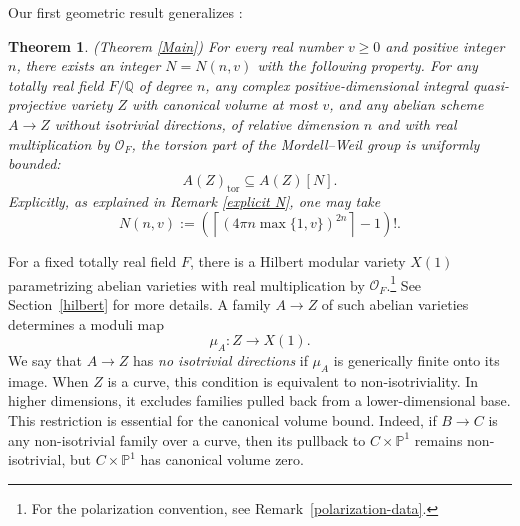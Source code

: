 \documentclass[12 pt]{amsart}
\newtheorem{theorem}{Theorem}[section]
\theoremstyle{definition}
\begin{document}
Our first geometric result
generalizes \cite[Theorem~A]{bakker2018geometric}:
\renewcommand*{\thetheorem}{\Alph{theorem}}
\begin{theorem}\label{Canonical vol}(Theorem \ref{Main})
For every real number \(v\geq 0\) and positive integer \(n\), there exists
an integer \(N=N(n,v)\) with the following property. For any totally real field
\(F/\mathbb Q\) of degree \(n\), any complex positive-dimensional integral
quasi-projective variety \(Z\) with canonical volume at most \(v\), and
any abelian scheme \(A\to Z\) without isotrivial directions, of relative
dimension \(n\) and with real multiplication by \(\mathcal O_F\), the
torsion part of the Mordell--Weil group is uniformly bounded:
\[
A(Z)_{\mathrm{tor}}\subseteq A(Z)[N].
\]
Explicitly, as explained in Remark \ref{explicit N}, one may take
\[N(n,v):=
\left(
\left\lceil
\left(4\pi n\max\{1,v\}\right)^{2n}
\right\rceil-1
\right)!.\]
\end{theorem}


For a fixed totally real field \(F\), there is a Hilbert modular variety
\(X(1)\) parametrizing abelian varieties with real multiplication by
\(\mathcal O_F\).\footnote{For the polarization convention, see Remark~\ref{polarization-data}.} See Section~\ref{hilbert} for more details. A family
\(A\to Z\) of such abelian varieties determines a moduli map
\[
\mu_A\colon Z\longrightarrow X(1).
\]
We say that \(A\to Z\) has \emph{no isotrivial directions} if
\(\mu_A\) is generically finite onto its image. When \(Z\) is a curve,
this condition is equivalent to non-isotriviality. In higher dimensions,
it excludes families pulled back from a lower-dimensional base. This restriction is essential for the canonical volume bound. Indeed, if \(B\to C\) is any non-isotrivial family over a curve, then its pullback to \(C\times\mathbb P^1\) remains non-isotrivial, but \(C\times\mathbb P^1\) has canonical volume zero.
\end{document}
